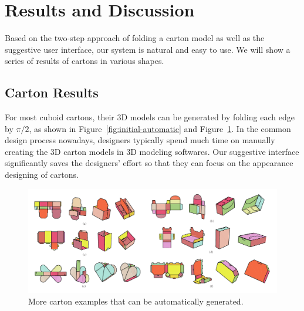 \section{Results and Discussion}\label{sec:result}


Based on the two-step approach of folding a carton model as well as the suggestive user interface, our system is natural and easy to use. 
%
We will show a series of results of cartons in various shapes. 
%

\subsection{Carton Results}


For most cuboid cartons, their 3D models can be generated by folding each edge by $\pi/2$, as shown in Figure~\ref{fig:initial-automatic} and Figure~\ref{fig:automatic-more}.
In the common design process nowadays, designers typically spend much time on manually creating the 3D carton models in 3D modeling softwares. 
Our suggestive interface significantly saves the designers' effort so that they can focus on the appearance designing of cartons. 


\begin{figure}
	\centering
	\includegraphics[width=\textwidth]{images/moreAutomatic}
	\caption{More carton examples that can be automatically generated.   }
	\label{fig:automatic-more}
	
\end{figure}



